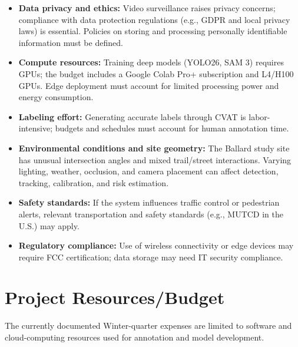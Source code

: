 \documentclass[12pt,letterpaper]{article}
\begin{document}
\begin{itemize}
    \item \textbf{Data privacy and ethics:} Video surveillance raises privacy concerns; compliance with data protection regulations (e.g., GDPR and local privacy laws) is essential. Policies on storing and processing personally identifiable information must be defined.~\cite{gdpr1,gdpr2}

    \item \textbf{Compute resources:} Training deep models (YOLO26, SAM 3) requires GPUs; the budget includes a Google Colab Pro+ subscription and L4/H100 GPUs. Edge deployment must account for limited processing power and energy consumption.~\cite{yolo26,sam3}

    \item \textbf{Labeling effort:} Generating accurate labels through CVAT is labor-intensive; budgets and schedules must account for human annotation time.~\cite{cvat}

    \item \textbf{Environmental conditions and site geometry:} The Ballard study site has unusual intersection angles and mixed trail/street interactions. Varying lighting, weather, occlusion, and camera placement can affect detection, tracking, calibration, and risk estimation.~\cite{darling,report-guide}

    \item \textbf{Safety standards:} If the system influences traffic control or pedestrian alerts, relevant transportation and safety standards (e.g., MUTCD in the U.S.) may apply.~\cite{mutcd}

    \item \textbf{Regulatory compliance:} Use of wireless connectivity or edge devices may require FCC certification; data storage may need IT security compliance.~\cite{fcc}
\end{itemize}

\section{Project Resources/Budget}

The currently documented Winter-quarter expenses are limited to software and cloud-computing resources used for annotation and model development.~\cite{darling,report-guide}
\end{document}
